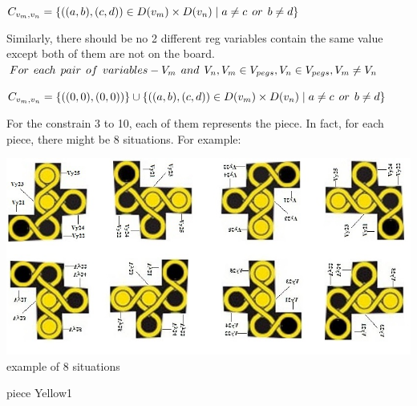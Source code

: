 \begin{center}
$C_{v_{m},v_{n}}=\{((a,b),(c,d))\in D(v_{m}) \times D(v_{n})\mid a \neq c   \hspace{1ex} or \hspace{1ex}  b \neq d\}$
\end{center}
Similarly, there should be no 2 different reg variables contain the same value except both of them are not on the board.\\
$For \hspace{1ex} each \hspace{1ex} pair \hspace{1ex} of\hspace{1ex} variables-V_{m}\hspace{1ex} and \hspace{1ex}V_{n}, V_{m} \in V_{pegs}, V_{n} \in V_{pegs}, V_{m} \neq V_{n}$
\begin{center}
$C_{v_{m},v_{n}}=\{((0,0),(0,0))\}\cup \{((a,b),(c,d))\in D(v_{m})\times D(v_{n})\mid a \neq c   \hspace{1ex} or \hspace{1ex}  b \neq d\}$\\
\end{center}
For the constrain 3 to 10, each of them represents the piece. In fact, for each piece, there might be 8 situations. For example:
\begin{center}
\includegraphics[scale=0.5]{figs/domainexplain.jpg}\\
example of 8 situations
\end{center}
 piece Yellow1
